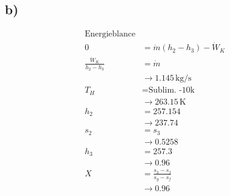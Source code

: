 

\subsection*{b)}
\begin{align*}
    \text{Energieblance} \\
    0 &= \dot{m} (h_2 - h_3) - \dot{W}_K \\
    \frac{\dot{W}_K}{h_2 - h_3} &= \dot{m} \\
    &\rightarrow 1.145 \, \text{kg/s} \\
    T_H &= \text{Sublim. -10k} \\
    &\rightarrow 263.15 \, \text{K} \\
    h_2 &= 257.154 \\
    &\rightarrow 237.74 \\
    s_2 &= s_3 \\
    &\rightarrow 0.5258 \\
    h_3 &= 257.3 \\
    &\rightarrow 0.96 \\
    X &= \frac{s_3 - s_f}{s_g - s_f} \\
    &\rightarrow 0.96
\end{align*}